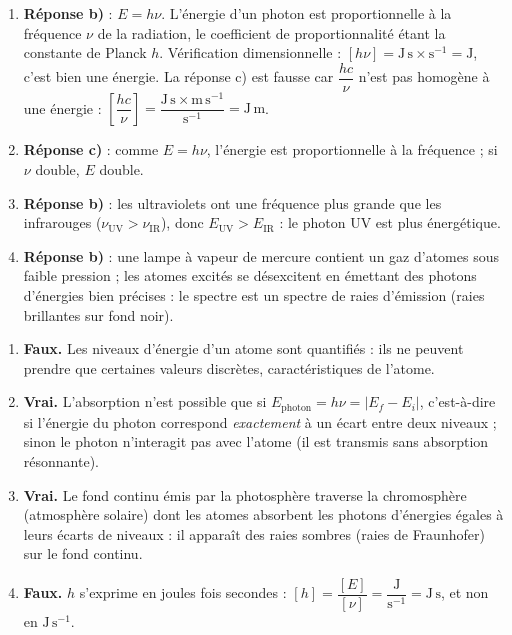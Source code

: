 \documentclass[11pt]{article}
\newcommand{\cle}[1]{{\popxbold\color{popdark}#1}}
\begin{document}
\begin{corrige}
\begin{enumerate}
\item \textbf{Réponse b)} : $E = h\nu$. L'énergie d'un photon est proportionnelle à la fréquence $\nu$ de la radiation, le coefficient de proportionnalité étant la constante de Planck $h$. Vérification dimensionnelle : $[h\nu] = \mathrm{J\,s}\times\mathrm{s^{-1}} = \mathrm{J}$, c'est bien une énergie. La réponse c) est fausse car $\dfrac{hc}{\nu}$ n'est pas homogène à une énergie : $\left[\dfrac{hc}{\nu}\right] = \dfrac{\mathrm{J\,s}\times\mathrm{m\,s^{-1}}}{\mathrm{s^{-1}}} = \mathrm{J\,m}$.
\item \textbf{Réponse c)} : comme $E = h\nu$, l'énergie est proportionnelle à la fréquence ; si $\nu$ double, $E$ double.
\item \textbf{Réponse b)} : les ultraviolets ont une fréquence plus grande que les infrarouges ($\nu_{\mathrm{UV}} > \nu_{\mathrm{IR}}$), donc $E_{\mathrm{UV}} > E_{\mathrm{IR}}$ : le photon UV est plus énergétique.
\item \textbf{Réponse b)} : une lampe à vapeur de mercure contient un gaz d'atomes sous faible pression ; les atomes excités se désexcitent en émettant des photons d'énergies bien précises : le spectre est un spectre de \cle{raies d'émission} (raies brillantes sur fond noir).
\end{enumerate}
\end{corrige}

\begin{corrige}
\begin{enumerate}
\item \textbf{Faux.} Les niveaux d'énergie d'un atome sont \cle{quantifiés} : ils ne peuvent prendre que certaines valeurs discrètes, caractéristiques de l'atome.
\item \textbf{Vrai.} L'absorption n'est possible que si $E_{\text{photon}} = h\nu = |E_f - E_i|$, c'est-à-dire si l'énergie du photon correspond \emph{exactement} à un écart entre deux niveaux ; sinon le photon n'interagit pas avec l'atome (il est transmis sans absorption résonnante).
\item \textbf{Vrai.} Le fond continu émis par la photosphère traverse la chromosphère (atmosphère solaire) dont les atomes absorbent les photons d'énergies égales à leurs écarts de niveaux : il apparaît des raies sombres (raies de Fraunhofer) sur le fond continu.
\item \textbf{Faux.} $h$ s'exprime en joules fois secondes : $[h] = \dfrac{[E]}{[\nu]} = \dfrac{\mathrm{J}}{\mathrm{s^{-1}}} = \mathrm{J\,s}$, et non en $\mathrm{J\,s^{-1}}$.
\end{enumerate}
\end{corrige}
\end{document}
